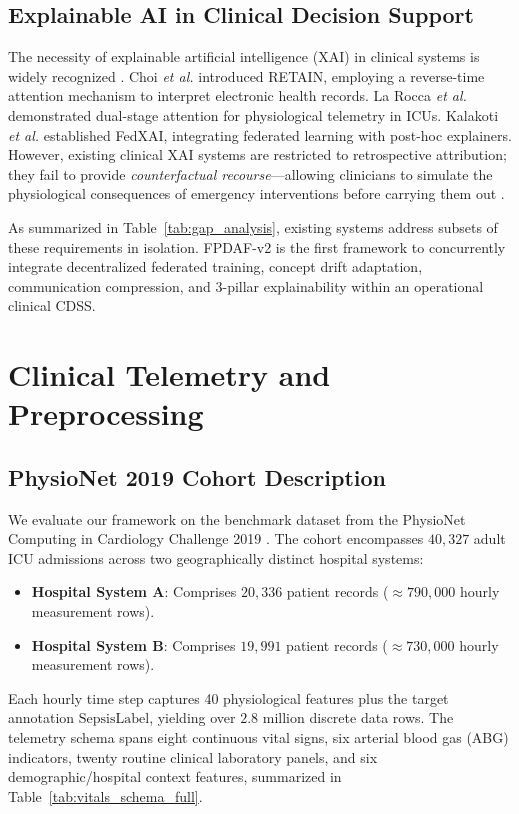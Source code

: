 \documentclass[journal,twocolumn,10pt]{IEEEtran}
\begin{document}
\subsection{Explainable AI in Clinical Decision Support}
The necessity of explainable artificial intelligence (XAI) in clinical systems is widely recognized \cite{lundberg2018explainable,sundararajan2017axiomatic}. Choi \textit{et al.} \cite{choi2016retain} introduced RETAIN, employing a reverse-time attention mechanism to interpret electronic health records. La Rocca \textit{et al.} \cite{larocca2021attention} demonstrated dual-stage attention for physiological telemetry in ICUs. Kalakoti \textit{et al.} \cite{kalakoti2025fedxai} established FedXAI, integrating federated learning with post-hoc explainers. However, existing clinical XAI systems are restricted to retrospective attribution; they fail to provide \textit{counterfactual recourse}—allowing clinicians to simulate the physiological consequences of emergency interventions before carrying them out \cite{larocca2022shap}.

As summarized in Table~\ref{tab:gap_analysis}, existing systems address subsets of these requirements in isolation. FPDAF-v2 is the first framework to concurrently integrate decentralized federated training, concept drift adaptation, communication compression, and 3-pillar explainability within an operational clinical CDSS.

\section{Clinical Telemetry and Preprocessing}
\subsection{PhysioNet 2019 Cohort Description}
We evaluate our framework on the benchmark dataset from the PhysioNet Computing in Cardiology Challenge 2019 \cite{reyna2020physionet}. The cohort encompasses $40,327$ adult ICU admissions across two geographically distinct hospital systems:
\begin{itemize}
    \item \textbf{Hospital System A}: Comprises $20,336$ patient records ($\approx 790,000$ hourly measurement rows).
    \item \textbf{Hospital System B}: Comprises $19,991$ patient records ($\approx 730,000$ hourly measurement rows).
\end{itemize}
Each hourly time step captures 40 physiological features plus the target annotation $\text{SepsisLabel}$, yielding over $2.8$ million discrete data rows. The telemetry schema spans eight continuous vital signs, six arterial blood gas (ABG) indicators, twenty routine clinical laboratory panels, and six demographic/hospital context features, summarized in Table~\ref{tab:vitals_schema_full}.
\end{document}
